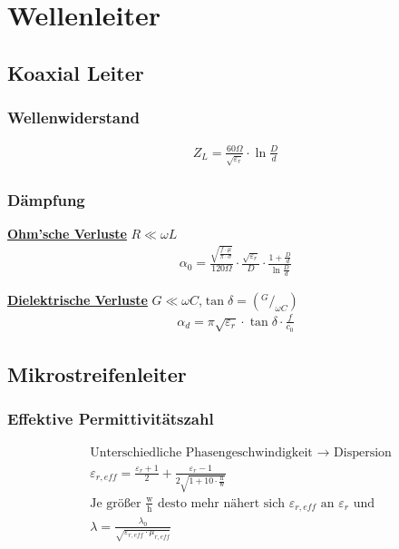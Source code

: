 \section{Wellenleiter}
\subsection{Koaxial Leiter}
\subsubsection{Wellenwiderstand}


\begin{align*}
    Z_L = \frac{60\Omega}{\sqrt{\varepsilon_r}}\cdot \ln{\frac{D}{d}}
\end{align*}

\subsubsection{Dämpfung}
\underline{\textbf{Ohm'sche Verluste}} $R\ll\omega L$
\begin{align*}
    \alpha_0 = \frac{\sqrt{\frac{f\cdot\mu}{\pi\cdot\sigma}}}{120\Omega}\cdot\frac{\sqrt{\varepsilon_r}}{D}\cdot\frac{1+\frac{D}{d}}{\ln \frac{D}{d}}
\end{align*}

\underline{\textbf{Dielektrische Verluste}} $G\ll\omega C$,$\tan\delta= (^G/_{\omega C})$
\begin{align*}
    \alpha_d = \pi\sqrt{\varepsilon_r}\cdot\tan\delta\cdot\frac{f}{c_0}
\end{align*}

\subsection{Mikrostreifenleiter}

\subsubsection{Effektive Permittivitätszahl}
\begin{align*}
     & \text{Unterschiedliche Phasengeschwindigkeit $\rightarrow$ Dispersion}                                              \\
     & \varepsilon_{r,eff}  = \frac{\varepsilon_r+1}{2}+\frac{\varepsilon_r-1}{2\sqrt{1+10\cdot\frac{\text{h}}{\text{w}}}} \\
     & \text{Je größer $\frac{\text{w}}{\text{h}}$ desto mehr nähert sich $\varepsilon_{r,eff}$ an $\varepsilon_r$ und}    \\
     & \lambda              = \frac{\lambda_0}{\sqrt{\varepsilon_{r,eff}\cdot\mu_{r,eff}}}
\end{align*}
